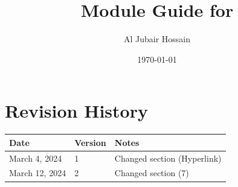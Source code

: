 \documentclass[12pt, titlepage]{article}
\begin{document}
\title{Module Guide for } 
\author{Al Jubair Hossain}
\date{\today}

\maketitle


\section{Revision History}

\begin{tabularx}{\textwidth}{p{3cm}p{2cm}X}
\toprule {\bf Date} & {\bf Version} & {\bf Notes}\\
\midrule
March 4, 2024 & 1 & Changed section (Hyperlink)\\
March 12, 2024 & 2 & Changed section (7)\\
\bottomrule
\end{tabularx}

\newpage




\end{document}

